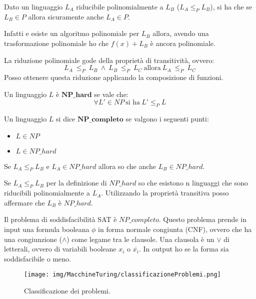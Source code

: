 \begin{teorema}
    Dato un linguaggio $L_A$ riducibile polinomialmente a $L_B$ ($L_A \leq_P L_B$), si ha che se $L_B \in P$ allora sicuramente anche $L_A \in P$.
\end{teorema}
\begin{dimostrazione}
    Infatti e esiste un algoritmo polinomiale per $L_B$ allora, avendo una trasformazione polinomiale ho che $f(x) + L_B$ è ancora polinomiale.
\end{dimostrazione}
\begin{teorema}
    La riduzione polinomiale gode della proprietà di transitività, ovvero:
    \begin{equation}
        L_A \ \leq_P \ L_B \ \land \ L_B \ \leq_P \ L_C \ \text{allora} \ L_A \ \leq_P \ L_C
    \end{equation}
    Posso ottenere questa riduzione applicando la composizione di funzioni.
\end{teorema}
\begin{definizione}
    Un linguaggio $L$ è $\textbf{NP}\_\textbf{hard}$ se vale che:
    \begin{equation}
        \forall L' \in NP \ \text{si ha} \ L' \leq_P L
    \end{equation}
\end{definizione}
\begin{definizione}
    Un linguaggio $L$ si dice $\textbf{NP}\_\textbf{completo}$ se valgono i seguenti punti:
    \begin{itemize}
        \item $L \in NP$
        \item $L \in NP\_hard$
    \end{itemize}
\end{definizione}
\begin{teorema}
    Se $L_A \leq_P L_B$ e $L_A \in NP\_hard$ allora so che anche $L_B \in NP\_hard$.
\end{teorema}
\begin{dimostrazione}
    Se $L_A \leq_P L_B$ per la definizione di $NP\_hard$ so che esistono n linguaggi che sono riducibili polinomialmente a $L_A$. Utilizzando la proprietà transitiva posso affermare che $L_B$ è $NP\_hard$.
\end{dimostrazione}
\begin{teorema}
    Il problema di soddisfacibilità SAT è $NP\_completo$. Questo problema prende in input una formula booleana $\phi$ in forma normale congiunta (CNF), ovvero che ha una congiunzione ($\land$) come legame tra le clausole. Una clausola è un $\lor$ di letterali, ovvero di variabili booleane $x_i$ o $\overline{x_i}$. In output ho se la forma sia soddisfacibile o meno.   
\end{teorema}
\begin{figure}[!ht]
    \centering
    \texttt{[image: img/MacchineTuring/classificazioneProblemi.png]}
    \caption{Classificazione dei problemi.}
\end{figure}